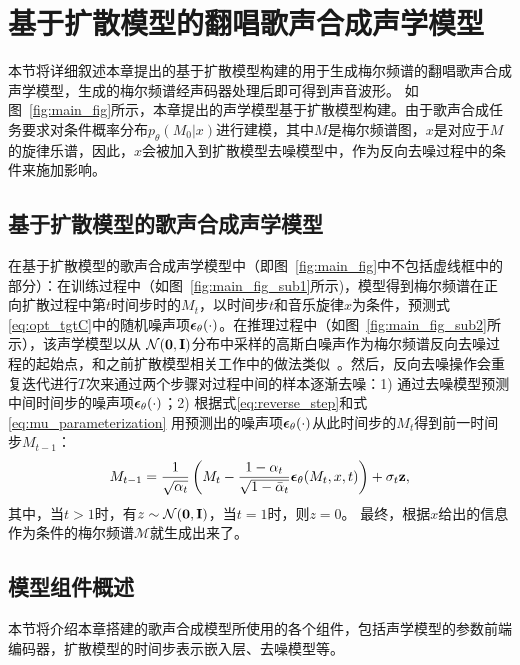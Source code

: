 \section{基于扩散模型的翻唱歌声合成声学模型}
本节将详细叙述本章提出的基于扩散模型构建的用于生成梅尔频谱的翻唱歌声合成声学模型，生成的梅尔频谱经声码器处理后即可得到声音波形。
如图~\ref{fig:main_fig}所示，本章提出的声学模型基于扩散模型构建。由于歌声合成任务要求对条件概率分布$p_\theta(M_{0}|x)$进行建模，其中$M$是梅尔频谱图，$x$是对应于$M$的旋律乐谱，因此，$x$会被加入到扩散模型去噪模型中，作为反向去噪过程中的条件来施加影响。
\subsection{基于扩散模型的歌声合成声学模型}
\label{sec:naive_diffsinger}
在基于扩散模型的歌声合成声学模型中（即图~\ref{fig:main_fig}中不包括虚线框中的部分）：在训练过程中（如图~\ref{fig:main_fig_sub1}所示)，模型得到梅尔频谱在正向扩散过程中第$t$时间步时的$M_t$，以时间步$t$和音乐旋律$x$为条件，预测式\eqref{eq:opt_tgtC}中的随机噪声项${\boldsymbol{\epsilon}}_\theta(\cdot)$。在推理过程中（如图~\ref{fig:main_fig_sub2}所示），该声学模型以从
$\mathcal{N}(\mathbf{0}, \mathbf{I})$分布中采样的高斯白噪声作为梅尔频谱反向去噪过程的起始点，和之前扩散模型相关工作中的做法类似~\citep{Ho2020ddpm,kong2021diffwave}。然后，反向去噪操作会重复迭代进行$T$次来通过两个步骤对过程中间的样本逐渐去噪：1) 通过去噪模型预测中间时间步的噪声项${\boldsymbol{\epsilon}}_\theta(\cdot)$；2) 根据式\eqref{eq:reverse_step}和式\eqref{eq:mu_parameterization}
用预测出的噪声项${\boldsymbol{\epsilon}}_\theta(\cdot)$从此时间步的$M_t$得到前一时间步$M_{t-1}$：
\begin{equation}
    M_{t-1} = \frac{1}{\sqrt{\alpha_t}}\left( M_t - \frac{1-\alpha_t}{\sqrt{1-\bar\alpha_t}} {\boldsymbol{\epsilon}}_\theta(M_t, x, t) \right) + \sigma_t \mathbf{z},
\end{equation}
其中，当$t>1$时，有$z\sim\mathcal{N}(\mathbf{0}, \mathbf{I})$，当$t=1$时，则$z=0$。
最终，根据$x$给出的信息作为条件的梅尔频谱$\mathcal{M}$就生成出来了。
\subsection{模型组件概述}
本节将介绍本章搭建的歌声合成模型所使用的各个组件，包括声学模型的参数前端编码器，扩散模型的时间步表示嵌入层、去噪模型等。
